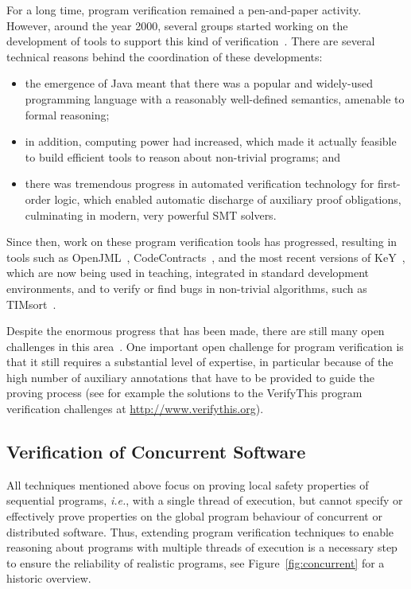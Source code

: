 For a long time, program verification remained a pen-and-paper activity. However, around the year 2000, several groups started working on the development of tools to support this kind of verification~\cite{Huisman01,BergJ01,BartheBCGHLPR07,BeckertHS07,CokK04,MeyerP00}. There are several technical reasons behind the coordination of these developments:
\begin{itemize}[topsep=0pt,noitemsep]
\item the emergence of Java meant that there was a popular and widely-used programming language with a reasonably well-defined semantics, amenable to formal reasoning;
\item in addition, computing power had increased, which made it actually feasible to build efficient tools to reason about non-trivial programs; and
\item there was tremendous progress in automated verification technology for first-order logic, which enabled automatic discharge of auxiliary proof obligations, culminating in modern, very powerful SMT solvers.
\end{itemize}
Since then, work on these program verification tools has progressed, resulting in tools such as OpenJML~\cite{Cok14}, CodeContracts~\cite{Logozzo11,FahndrichLLB12}, and the most recent versions of KeY~\cite{Ahrendt16}, which are now being used in teaching, integrated in standard development environments, and to verify or find bugs in non-trivial algorithms, such as TIMsort~\cite{DeGouwRBBH15}. 

Despite the enormous progress that has been made, there are still many open challenges in this area~\cite{HaehnleH18}. One important open challenge for program verification is that it still requires a substantial level of expertise, in particular because of the high number of auxiliary annotations that have to be provided to guide the proving process (see for example the solutions to the VerifyThis program verification challenges at \url{http://www.verifythis.org}). 


\subsection{Verification of Concurrent Software}
 All techniques mentioned above focus on proving local safety properties of sequential programs, \emph{i.e.}, with a single thread of execution, but cannot specify or effectively prove properties on the global program behaviour of concurrent or distributed software.  Thus, extending program verification techniques to enable reasoning about programs with multiple threads of execution is a necessary step to ensure the reliability of realistic programs, see Figure~\ref{fig:concurrent} for a historic overview.

